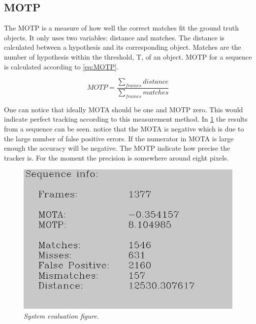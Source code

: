 \subsection{MOTP}
The MOTP is a measure of how well the correct matches fit the ground truth objects. It only uses two variables: distance and matches. The distance is calculated between a hypothesis and its corresponding object. Matches are the number of hypothesis within the 
threshold, T, of an object. MOTP for a sequence is calculated according to \eqref{eq:MOTP}.

\begin{equation}
\label{eq:MOTP}
MOTP = \frac{\sum_{frames}{distance}}{\sum_{frames}{matches}}
\end{equation}

One can notice that ideally MOTA should be one and MOTP zero. This would indicate perfect tracking according to this measurement method. In \ref{fig:system_evaluation_fig} the results from a sequence can be seen. notice that the MOTA is negative which is due to the large number of false positive errors. If the numerator in MOTA is large enough the accuracy will be negative. The MOTP indicate how precise the tracker is. For the moment the precision is somewhere around eight pixels.

\begin{figure}[htb]
	\centering
	\includegraphics[width=\linewidth]{images/sequenceEvaluation}
	\caption{\textit{System evaluation figure.}}
	\label{fig:system_evaluation_fig} %
\end{figure}



